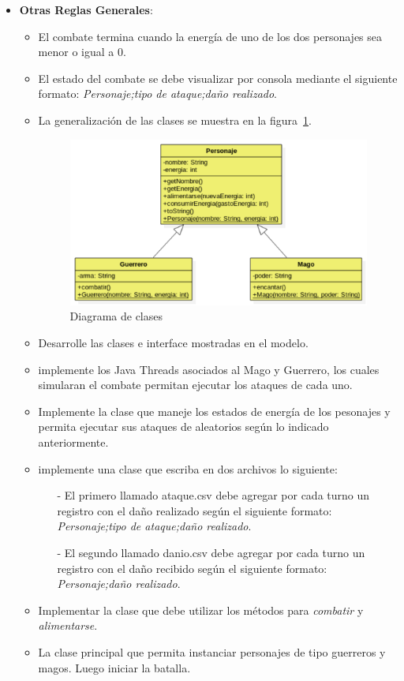 \documentclass{exam}
\begin{document}
\begin{itemize}
       \item \textbf{Otras Reglas Generales}:      
             \begin{itemize}
     \item El combate termina cuando la energ\'ia      de uno de los dos personajes sea menor o igual a 0.
     \item El estado del combate se debe visualizar por consola mediante el siguiente formato: \emph{Personaje;tipo de ataque;daño realizado}.
     \item La generalizaci\'on de las clases se muestra en la figura~\ref{fig-modelo}.
     \begin{figure}[htbp!]
       \begin{center}
         \includegraphics[width=10cm]{img/modelo.pdf}
         \caption{{\small Diagrama de clases}}\label{fig-modelo}
       \end{center}
     \end{figure}
     \item Desarrolle las clases e interface mostradas en el modelo.
     \item implemente los Java Threads asociados al Mago y Guerrero, los cuales simularan el combate  permitan ejecutar los ataques de cada uno.
     \item Implemente la clase que maneje los estados de energía de los pesonajes y permita ejecutar sus ataques de aleatorios según lo indicado anteriormente.
     \item implemente una clase que escriba en dos archivos lo siguiente:
     \begin{itemize}
       \item[-] El primero llamado ataque.csv debe agregar por cada turno un registro con el da\~no realizado según el siguiente formato: \emph{Personaje;tipo de ataque;daño realizado}.
       \item[-] El segundo llamado danio.csv debe agregar por cada turno un registro con el da\~no recibido seg\'un el siguiente formato: \emph{Personaje;da\~no realizado}.
     \end{itemize}
           \item Implementar la clase que debe utilizar los m\'etodos para \emph{combatir} y \emph{alimentarse}.
           \item La clase principal que permita instanciar personajes
             de tipo guerreros y magos. Luego iniciar la batalla.
       \end{itemize}



\end{itemize}
\end{document}

